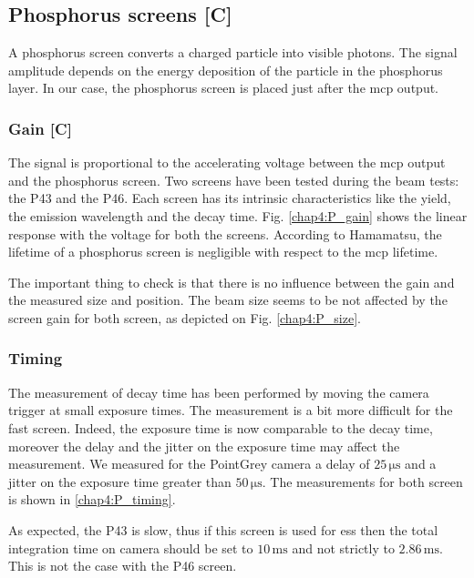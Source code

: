 \begin{refsection}
  

  \subsection{Phosphorus screens [C]}
  A phosphorus screen converts a charged particle into visible photons.
  The signal amplitude depends on the energy deposition of the particle in the phosphorus layer. In our case, the phosphorus screen is placed just after the \acrshort{mcp} output.

  \subsubsection{Gain [C]}
  The signal is proportional to the accelerating voltage between the \acrshort{mcp} output and the phosphorus screen. Two screens have been tested during the beam tests: the P43 and the P46. Each screen has its intrinsic characteristics like the yield, the emission wavelength and the decay time. Fig. \ref{chap4:P_gain} shows the linear response with the voltage for both the screens. According to Hamamatsu, the lifetime of a phosphorus screen is negligible with respect to the \acrshort{mcp} lifetime.

  

  The important thing to check is that there is no influence between the gain and the measured size and position. The beam size seems to be not affected by the screen gain for both screen, as depicted on Fig. \ref{chap4:P_size}.

  

  \subsubsection{Timing}
  The measurement of decay time has been performed by moving the camera trigger at small exposure times. The measurement is a bit more difficult for the fast screen. Indeed, the exposure time is now comparable to the decay time, moreover the delay and the jitter on the exposure time may affect the measurement.
  We measured for the PointGrey camera a delay of $25\,\mathrm{\mu s}$ and a jitter on the exposure time greater than $50\,\mathrm{\mu s}$. The measurements for both screen is shown in \ref{chap4:P_timing}.

  

  As expected, the P43 is slow, thus if this screen is used for \acrshort{ess} then the total integration time on camera should be set to $10\,\mathrm{ms}$ and not strictly to $2.86\,\mathrm{ms}$. This is not the case with the P46 screen.


\end{refsection}
